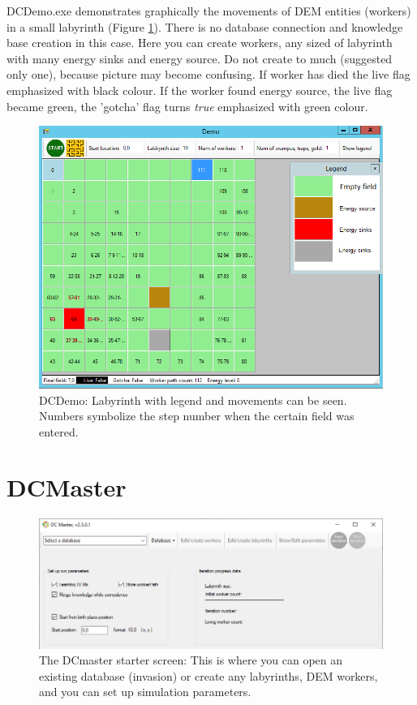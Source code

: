 \documentclass[a4paper,12pt]{article}
\begin{document}
DCDemo.exe  demonstrates graphically the movements of DEM entities (workers) in a small labyrinth (Figure \ref{fig:demo}). There is no database connection and knowledge base creation in this case. Here you can create workers, any sized of labyrinth with many energy sinks and energy source. Do not create to much (suggested only one), because picture may become confusing.
If worker has died the live flag emphasized with black colour. If the worker found energy source, the live flag became green, the 'gotcha' flag turns \textit{true} emphasized with green colour.

\begin{figure}
\centering
	\includegraphics[width=14cm]{demo.png}
	\caption{DCDemo: Labyrinth with legend and movements can be seen. Numbers symbolize the step number when the certain field was entered.}
	\label{fig:demo}
\end{figure}




\section{DCMaster}

\begin{figure}
	\begin{center}
		\includegraphics[width=15cm]{master1.png}
		\caption{The DCmaster starter screen: This is where you can open an existing database (invasion) or create any labyrinths, DEM workers, and you can set up simulation parameters. }
		\label{fig:master1}
	\end{center}
\end{figure}
\end{document}
